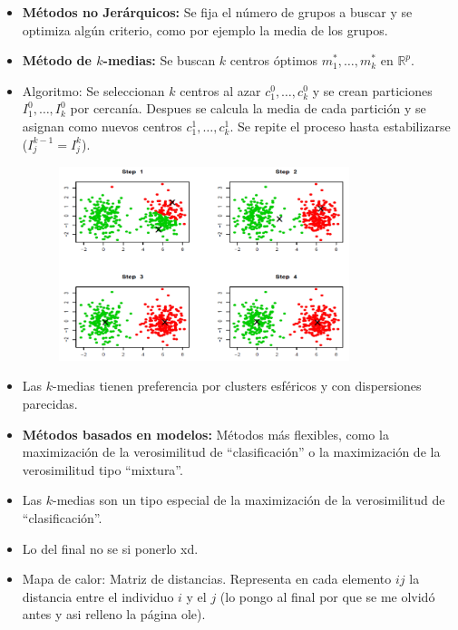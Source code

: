 \begin{itemize}
\begin{figure}[h]
    \end{figure}
    \item \textbf{Métodos no Jerárquicos:} Se fija el número de grupos a buscar y se optimiza algún criterio, como por ejemplo la media de los grupos.
    \item \textbf{Método de $k$-medias:} Se buscan $k$ centros óptimos $m_1^*,\dots,m_k^*$ en $\mathbb{R}^p$.
    \item Algoritmo: Se seleccionan $k$ centros al azar $c_1^0,\dots,c_k^0$ y se crean particiones $I_1^0,\dots,I_k^0$ por cercanía. Despues se calcula la media de cada partición y se asignan como nuevos centros $c_1^1,\dots,c_k^1$. Se repite el proceso hasta estabilizarse ($I_j^{k-1}=I_j^k$).
    \begin{figure}[h]
        \centering
        \includegraphics[width=0.8\textwidth]{assets/k_means.png}
    \end{figure}
    \newpage
    \item Las $k$-medias tienen preferencia por clusters esféricos y con dispersiones parecidas.
    \item \textbf{Métodos basados en modelos:} Métodos más flexibles, como la maximización de la verosimilitud de ``clasificación'' o la maximización de la verosimilitud tipo ``mixtura''.
    \item Las $k$-medias son un tipo especial de la maximización de la verosimilitud de ``clasificación''.
    \item Lo del final no se si ponerlo xd.
    \item Mapa de calor: Matriz de distancias. Representa en cada elemento $ij$ la distancia entre el individuo $i$ y el $j$ (lo pongo al final por que se me olvidó antes y asi relleno la página ole).
    \begin{figure}[h]
        \centering

\end{figure}
\end{itemize}
